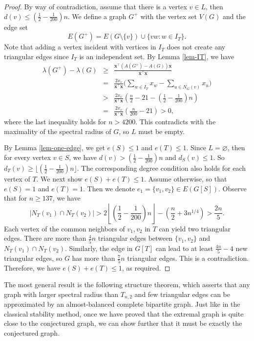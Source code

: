 \documentclass[11pt]{article}
\begin{document}
\begin{proof}
By way of contradiction, assume that there is a vertex  $v\in L$, then $d(v)\le (\frac{1}{2}-\frac{1}{200})n$.
We define a graph $G^+$ with the vertex set $V(G)$ and the edge set 
\[  E(G^+) = E(G \setminus \{v\}) \cup \{vw: w\in I_T\}. \] 
 Note that adding a vertex incident with vertices in $I_T$ does not create any triangular edges   
since $I_T$ is an independent set.  
By Lemma \ref{lem-IT},  we have 
\begin{eqnarray*}
\lambda (G^+) - \lambda (G) &\geq &
 \frac{\mathbf{x}^{\top} \left(A(G^+) - A(G)\right) \mathbf{x}}{\mathbf{x}^{\top} \mathbf{x}} \\
 & =& \frac{2 {x}_v}{\mathbf{x}^{\top}\mathbf{x}} 
 \biggl( \sum_{w\in I_T} {x}_w - \sum_{u\in N_G(v)} {x}_u\biggr) \\
& >& \frac{2 {x}_v}{\mathbf{x}^{\top} \mathbf{x}} 
\left( \frac{n}{2} - 21 - 
\left(\frac{1}{2}-\frac{1}{200} \right)n \right)\\
&=& \frac{2 {x}_v}{\mathbf{x}^{\top} \mathbf{x}} \left( \frac{n}{200}-21\right)> 0,
\end{eqnarray*}
where the last inequality holds for $n> 4200$. This contradicts 
with the maximality of the spectral radius  of $G$, so $L$ must be empty. 


By Lemma \ref{lem-one-edge}, 
we  get 
$e(S) \le 1$ and $e(T) \le 1$. 
Since $L=\varnothing$, then for every vertex $v\in S$, we have 
$d(v) > (\frac{1}{2} - \frac{1}{200})n $ and 
$d_S(v) \le 1$. So $d_T(v) \ge \lfloor (\frac{1}{2} - \frac{1}{200} )n \rfloor$. The corresponding degree condition also holds for 
each vertex of $T$. We next show $e(S) + e(T)\le 1$. 
Assume otherwise, so that $e(S)=1 $ and $ e(T)=1$. 
Then we denote $e_1=\{v_1,v_2\}\in E(G[S])$. 
Observe that for $n\ge 137$, we have 
\[  |N_T(v_1) \cap N_T(v_2)| >  2 \left\lfloor \left(\frac{1}{2} - \frac{1}{200} \right)n \right\rfloor - \left(\frac{n}{2} + 3n^{1/4} \right) > \frac{2n}{5}.\]
Each vertex of the common neighbors of $v_1,v_2$ in $T$ can yield 
two triangular edges. There are more than $\frac{4}{5}n$ triangular edges 
between $\{v_1,v_2\}$ and $N_T(v_1) \cap N_T(v_2)$.  
Similarly, the edge in $G[T]$ can lead to at least $\frac{4n}{5} -4$ 
new triangular edges,  so $G$ has 
more than $\frac{7}{5}n$ triangular edges. 
This is a contradiction. Therefore, we have 
$e(S) + e(T)\le 1$, as required. 
\end{proof}



The most general result is the following structure theorem, which 
asserts that any graph with larger spectral radius than $T_{n,2}$ 
and few triangular edges can be approximated by 
an almost-balanced complete bipartite graph. 
Just like in the classical stability method, 
once we have proved that the extremal graph is quite close to the 
conjectured graph, we can show further that it
must be exactly the conjectured graph. 
\end{document}
